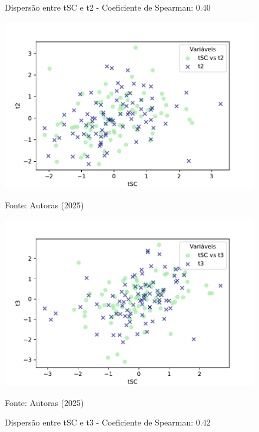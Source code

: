 \begin{figure}[h]
    \captionsetup{font=footnotesize, justification=centering, labelsep=period, position=above}
    \centering
    \begin{minipage}[b]{0.45\linewidth}
        \caption{Dispersão entre tSC e t2 - Coeficiente de Spearman: 0.40}
        \label{fig:tSC-t2}
        \centering
        \includegraphics[scale=0.35]{figuras/Spearman/tSC-t2.pdf}
        \vspace{0.3cm}
        \begin{minipage}{\linewidth}
            \centering
            \scriptsize{Fonte: Autoras (2025)}
        \end{minipage}
    \end{minipage}
    \hspace{0.05\linewidth}
    \begin{minipage}[b]{0.45\linewidth}
        \caption{Dispersão entre tSC e t3 - Coeficiente de Spearman: 0.42}
        \label{fig:tSC-t3}
        \centering
        \includegraphics[scale=0.35]{figuras/Spearman/tSC-t3.pdf}
        \vspace{0.3cm}
        \begin{minipage}{\linewidth}
            \centering
            \scriptsize{Fonte: Autoras (2025)}
        \end{minipage}
    \end{minipage}
\end{figure}
\FloatBarrier

